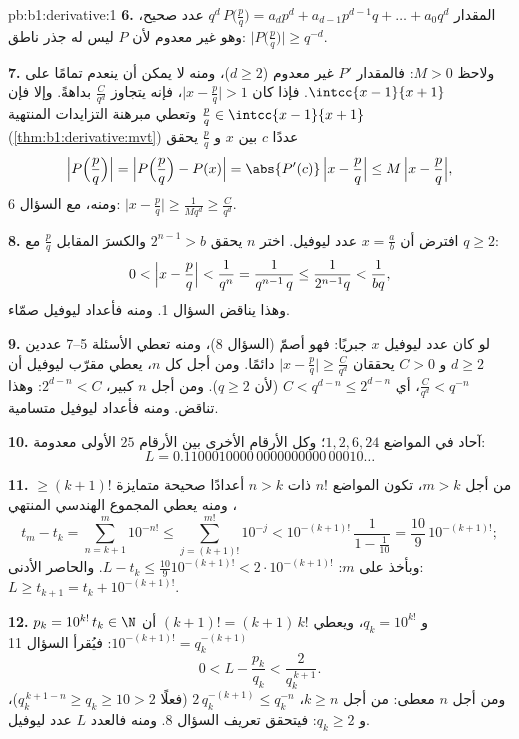 \begin{solution}{pb:b1:derivative:1}
\textbf{6.} المقدار $q^d\,P\bigl(\frac pq\bigr) = a_d p^d + a_{d-1}
p^{d-1} q + \dots + a_0 q^d$ عدد صحيح، وهو غير معدوم
لأن $P$ ليس له جذر ناطق: $\bigl|P\bigl(\frac
pq\bigr)\bigr| \geq q^{-d}$.

\textbf{7.} ولاحظ $M > 0$: فالمقدار $P'$  غير معدوم ($d \geq
2$)، ومنه لا يمكن أن ينعدم تمامًا على
$\intcc{x-1}{x+1}$. فإذا كان $\bigl|x - \frac pq\bigr| > 1$، فإنه
يتجاوز $\frac{C}{q^d}$ بداهةً. وإلا فإن $\frac pq \in
\intcc{x-1}{x+1}$ وتعطي مبرهنة التزايدات المنتهية
(\cref{thm:b1:derivative:mvt}) عددًا $c$ بين $x$ و
$\frac pq$ يحقق
\[
\Bigl|P\Bigl(\frac pq\Bigr)\Bigr|
= \Bigl|P\Bigl(\frac pq\Bigr) - P(x)\Bigr|
= \abs{P'(c)}\,\Bigl|x - \frac pq\Bigr|
\leq M\,\Bigl|x - \frac pq\Bigr| ,
\]
ومنه، مع السؤال 6: $\bigl|x - \frac pq\bigr| \geq
\frac{1}{Mq^d} \geq \frac{C}{q^d}$.

\textbf{8.} افترض أن $x = \frac ab$ عدد ليوفيل. اختر $n$ يحقق
$2^{n-1} > b$ والكسرَ المقابل $\frac pq$ مع $q \geq 2$:
\[
0 < \Bigl|x - \frac pq\Bigr| < \frac{1}{q^n}
= \frac{1}{q^{n-1}\,q} \leq \frac{1}{2^{n-1} q} <
\frac{1}{bq} ,
\]
وهذا يناقض السؤال 1. ومنه فأعداد ليوفيل صمّاء.

\textbf{9.} لو كان عدد ليوفيل $x$ جبريًا: فهو أصمّ
(السؤال 8)، ومنه تعطي الأسئلة 5--7 عددين $d \geq 2$ و $C > 0$
يحققان $\bigl|x - \frac pq\bigr| \geq \frac{C}{q^d}$ دائمًا. ومن أجل
كل $n$، يعطي مقرّب ليوفيل أن $\frac{C}{q^d} <
q^{-n}$، أي $C < q^{d-n} \leq 2^{d-n}$ (لأن $q \geq 2$). ومن أجل
$n$ كبير، $2^{d-n} < C$: وهذا تناقض. ومنه فأعداد ليوفيل
متسامية.

\textbf{10.} آحاد في المواضع $1, 2, 6, 24$؛ وكل الأرقام الأخرى
بين الأرقام $25$ الأولى معدومة:
\[
L = 0.1100010000\,0000000000\,00010\dots
\]

\textbf{11.} من أجل $m > k$، تكون المواضع $n!$ ذات $n > k$
أعدادًا صحيحة متمايزة $\geq (k+1)!$، ومنه يعطي المجموع الهندسي المنتهي
\[
t_m - t_k = \sum_{n=k+1}^{m} 10^{-n!}
\leq \sum_{j = (k+1)!}^{m!} 10^{-j}
< 10^{-(k+1)!}\,\frac{1}{1 - \frac1{10}}
= \frac{10}{9}\,10^{-(k+1)!} ;
\]
وبأخذ  على $m$: $L - t_k \leq
\frac{10}{9}10^{-(k+1)!} < 2\cdot10^{-(k+1)!}$. والحاصر الأدنى: $L
\geq t_{k+1} = t_k + 10^{-(k+1)!}$.

\textbf{12.} $p_k = 10^{k!}\,t_k \in \N$ و $q_k = 10^{k!}$، ويعطي
$(k+1)! = (k+1)\,k!$ أن $10^{-(k+1)!} = q_k^{-(k+1)}$:
فيُقرأ السؤال 11
\[
0 < L - \frac{p_k}{q_k} < \frac{2}{q_k^{\,k+1}} .
\]
ومن أجل $n$ معطى: من أجل $k \geq n$، $2\,q_k^{-(k+1)} \leq q_k^{-n}$
(فعلًا $q_k^{\,k+1-n} \geq q_k \geq 10 > 2$)، و $q_k \geq 2$:
فيتحقق تعريف السؤال 8. ومنه فالعدد $L$ عدد ليوفيل.


\end{solution}
